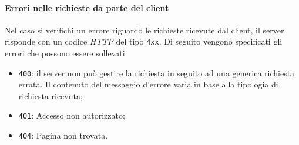 \paragraph{Errori nelle richieste da parte del client}
Nel caso si verifichi un errore riguardo le richieste ricevute dal client, il server risponde con un codice \textit{HTTP} del tipo \texttt{4xx}. Di seguito vengono specificati gli errori che possono essere sollevati:
	\begin{itemize}
		\item \texttt{400}: il server non può gestire la richiesta in seguito ad una generica richiesta errata. Il contenuto del messaggio d'errore varia in base alla tipologia di richiesta ricevuta;
		\item \texttt{401}: Accesso non autorizzato;
		\item \texttt{404}: Pagina non trovata.
	\end{itemize}
